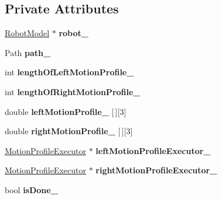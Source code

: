 \subsection*{Private Attributes}
\begin{DoxyCompactItemize}
\item 
\mbox{\label{class_path_command_aa6a8d5bdb0c926243b0f5ccc86ad92ff}} 
\hyperlink{class_robot_model}{Robot\+Model} $\ast$ {\bfseries robot\+\_\+}
\item 
\mbox{\label{class_path_command_a8fbec2fd0e2c338fab60a437c018a7a0}} 
Path {\bfseries path\+\_\+}
\item 
\mbox{\label{class_path_command_a5e0ad49c59397dd781fe49fd010a534e}} 
int {\bfseries length\+Of\+Left\+Motion\+Profile\+\_\+}
\item 
\mbox{\label{class_path_command_a7e302dc5bdc6863670c6c808227af2ce}} 
int {\bfseries length\+Of\+Right\+Motion\+Profile\+\_\+}
\item 
\mbox{\label{class_path_command_abc8680e2a7fef01f3f524d492a2414e6}} 
double {\bfseries left\+Motion\+Profile\+\_\+} \mbox{[}$\,$\mbox{]}\mbox{[}3\mbox{]}
\item 
\mbox{\label{class_path_command_a7baa75d4c65c1a41bbb1db5cf81cae39}} 
double {\bfseries right\+Motion\+Profile\+\_\+} \mbox{[}$\,$\mbox{]}\mbox{[}3\mbox{]}
\item 
\mbox{\label{class_path_command_a7849e4b9ed084e5906894f0d9d6e2c34}} 
\hyperlink{class_motion_profile_executor}{Motion\+Profile\+Executor} $\ast$ {\bfseries left\+Motion\+Profile\+Executor\+\_\+}
\item 
\mbox{\label{class_path_command_a244b142d11c2a135ae1d0e50ed0b2979}} 
\hyperlink{class_motion_profile_executor}{Motion\+Profile\+Executor} $\ast$ {\bfseries right\+Motion\+Profile\+Executor\+\_\+}
\item 
\mbox{\label{class_path_command_a92a777a063e9beecfb3461f54306c78f}} 
bool {\bfseries is\+Done\+\_\+}
\end{DoxyCompactItemize}


